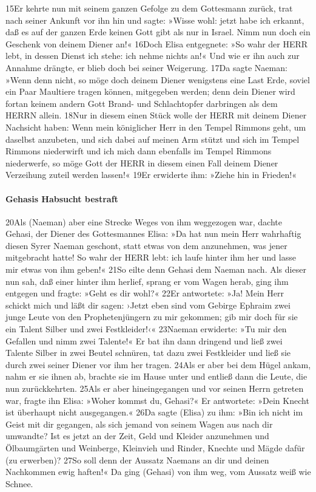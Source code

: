 15Er kehrte nun mit seinem ganzen Gefolge zu dem Gottesmann zurück, trat
nach seiner Ankunft vor ihn hin und sagte: »Wisse wohl: jetzt habe ich
erkannt, daß es auf der ganzen Erde keinen Gott gibt als nur in Israel.
Nimm nun doch ein Geschenk von deinem Diener an!« 16Doch Elisa
entgegnete: »So wahr der HERR lebt, in dessen Dienst ich stehe: ich
nehme nichts an!« Und wie er ihn auch zur Annahme drängte, er blieb doch
bei seiner Weigerung. 17Da sagte Naeman: »Wenn denn nicht, so möge doch
deinem Diener wenigstens eine Last Erde, soviel ein Paar Maultiere
tragen können, mitgegeben werden; denn dein Diener wird fortan keinem
andern Gott Brand- und Schlachtopfer darbringen als dem HERRN allein.
18Nur in diesem einen Stück wolle der HERR mit deinem Diener Nachsicht
haben: Wenn mein königlicher Herr in den Tempel Rimmons geht, um
daselbst anzubeten, und sich dabei auf meinen Arm stützt und sich im
Tempel Rimmons niederwirft und ich mich dann ebenfalls im Tempel Rimmons
niederwerfe, so möge Gott der HERR in diesem einen Fall deinem Diener
Verzeihung zuteil werden lassen!« 19Er erwiderte ihm: »Ziehe hin in
Frieden!«

\hypertarget{gehasis-habsucht-bestraft}{%
\paragraph{Gehasis Habsucht bestraft}\label{gehasis-habsucht-bestraft}}

20Als (Naeman) aber eine Strecke Weges von ihm weggezogen war, dachte
Gehasi, der Diener des Gottesmannes Elisa: »Da hat nun mein Herr
wahrhaftig diesen Syrer Naeman geschont, statt etwas von dem anzunehmen,
was jener mitgebracht hatte! So wahr der HERR lebt: ich laufe hinter ihm
her und lasse mir etwas von ihm geben!« 21So eilte denn Gehasi dem
Naeman nach. Als dieser nun sah, daß einer hinter ihm herlief, sprang er
vom Wagen herab, ging ihm entgegen und fragte: »Geht es dir wohl?« 22Er
antwortete: »Ja! Mein Herr schickt mich und läßt dir sagen: ›Jetzt eben
sind vom Gebirge Ephraim zwei junge Leute von den Prophetenjüngern zu
mir gekommen; gib mir doch für sie ein Talent Silber und zwei
Festkleider!‹« 23Naeman erwiderte: »Tu mir den Gefallen und nimm zwei
Talente!« Er bat ihn dann dringend und ließ zwei Talente Silber in zwei
Beutel schnüren, tat dazu zwei Festkleider und ließ sie durch zwei
seiner Diener vor ihm her tragen. 24Als er aber bei dem Hügel ankam,
nahm er sie ihnen ab, brachte sie im Hause unter und entließ dann die
Leute, die nun zurückkehrten. 25Als er aber hineingegangen und vor
seinen Herrn getreten war, fragte ihn Elisa: »Woher kommst du, Gehasi?«
Er antwortete: »Dein Knecht ist überhaupt nicht ausgegangen.« 26Da sagte
(Elisa) zu ihm: »Bin ich nicht im Geist mit dir gegangen, als sich
jemand von seinem Wagen aus nach dir umwandte? Ist es jetzt an der Zeit,
Geld und Kleider anzunehmen und Ölbaumgärten und Weinberge, Kleinvieh
und Rinder, Knechte und Mägde dafür (zu erwerben)? 27So soll denn der
Aussatz Naemans an dir und deinen Nachkommen ewig haften!« Da ging
(Gehasi) von ihm weg, vom Aussatz weiß wie Schnee.

